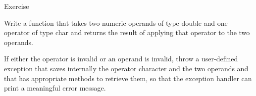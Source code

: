 \begin{frame}{Exercise}

  Write a function that takes two numeric operands of type double and one
  operator of type char and returns the result of applying that operator to the
  two operands.

  If either the operator is invalid or an operand is invalid, throw a
  user-defined exception that saves internally the operator character and the
  two operands and that has appropriate methods to retrieve them, so that the
  exception handler can print a meaningful error message.

\end{frame}

